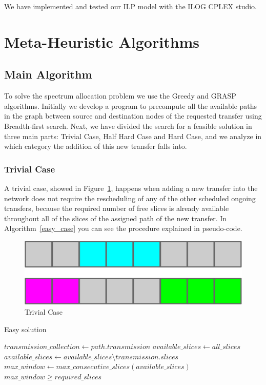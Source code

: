 \documentclass[11pt,a4paper]{article}
\begin{document}
We have implemented and tested our ILP model with the ILOG CPLEX studio.

\section{Meta-Heuristic Algorithms}

\subsection{Main Algorithm}

To solve the spectrum allocation problem we use the Greedy and GRASP algorithms. Initially we develop a program to precompute all the available paths in the graph between source and destination nodes of the requested transfer using Breadth-first search. Next, we have divided the search for a feasible solution in three main parts: Trivial Case, Half Hard Case and Hard Case, and we analyze in which category the addition of this new transfer falls into.

\subsubsection{Trivial Case}

A trivial case, showed in Figure~\ref{fig:trivial}, happens when adding a new transfer into the network does not require the rescheduling of any of the other scheduled ongoing transfers, because the required number of free slices is already available throughout all of the slices of the assigned path of the new transfer. In Algorithm~\ref{easy_case} you can see the procedure explained in pseudo-code.\\

\begin{figure}[H]
  \centering
    \includegraphics[scale=1]{trivialcase.jpg}
  \caption{Trivial Case}
  \label{fig:trivial}
\end{figure}

\begin{algorithm}[H]
\caption{Easy solution}\label{easy_case}
\begin{algorithmic}[1]
	\State $transmission\_collection\gets path.transmission$
	\State $available\_slices\gets all\_slices$
      \State $available\_slices \gets available\_slices\setminus transmission.slices$
	\EndFor
	\State $max\_window \gets max\_consecutive\_slices(available\_slices)$
	\State \Return $max\_window \geq required\_slices$
\EndProcedure
\end{algorithmic}
\end{algorithm}
\end{document}
